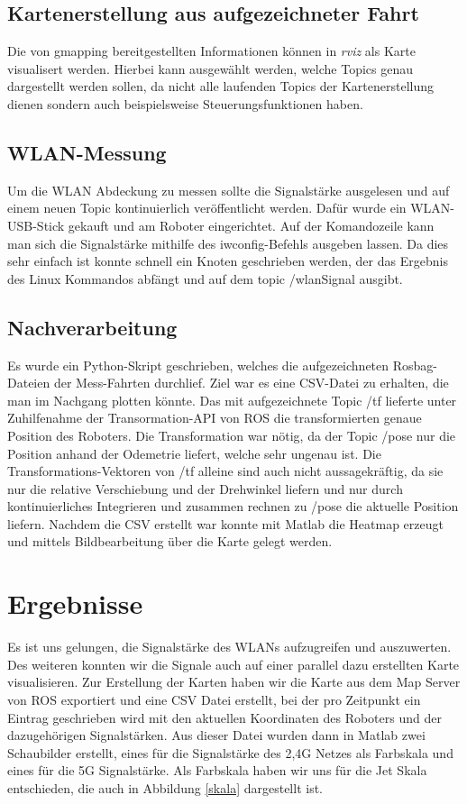 \documentclass{scrartcl}%
\begin{document}
\subsection{Kartenerstellung aus aufgezeichneter Fahrt}
Die von gmapping bereitgestellten Informationen können in \textit{rviz} als Karte visualisert werden. Hierbei kann ausgewählt werden, welche Topics genau dargestellt werden sollen, da nicht alle laufenden Topics der Kartenerstellung dienen sondern auch beispielsweise Steuerungsfunktionen haben.

\subsection{WLAN-Messung}
Um die WLAN Abdeckung zu messen sollte die Signalstärke ausgelesen und auf einem neuen Topic kontinuierlich veröffentlicht werden. Dafür wurde ein WLAN-USB-Stick gekauft und am Roboter eingerichtet. Auf der Komandozeile kann man sich die Signalstärke mithilfe des iwconfig-Befehls ausgeben lassen. Da dies sehr einfach ist konnte schnell ein Knoten geschrieben werden, der das Ergebnis des Linux Kommandos abfängt und auf dem topic /wlanSignal ausgibt.


\subsection{Nachverarbeitung}
Es wurde ein Python-Skript geschrieben, welches die aufgezeichneten Rosbag-Dateien der Mess-Fahrten durchlief. Ziel war es eine CSV-Datei zu erhalten, die man im Nachgang plotten könnte. Das mit aufgezeichnete Topic /tf lieferte unter Zuhilfenahme der Transormation-API von ROS die transformierten genaue Position des Roboters. Die Transformation war nötig, da der Topic /pose nur die Position anhand der Odemetrie liefert, welche sehr ungenau ist. Die Transformations-Vektoren von /tf alleine sind auch nicht aussagekräftig, da sie nur die relative Verschiebung und der Drehwinkel liefern und nur durch kontinuierliches Integrieren und zusammen rechnen zu /pose die aktuelle Position liefern. Nachdem die CSV erstellt war konnte mit Matlab die Heatmap erzeugt und mittels Bildbearbeitung über die Karte gelegt werden.

\newpage
\section{Ergebnisse}
Es ist uns gelungen, die Signalstärke des WLANs aufzugreifen und auszuwerten. Des weiteren konnten wir die Signale auch auf einer parallel dazu erstellten Karte visualisieren. Zur Erstellung der Karten haben wir die Karte aus dem Map Server von ROS exportiert und eine CSV Datei erstellt, bei der pro Zeitpunkt ein Eintrag geschrieben wird mit den aktuellen Koordinaten des Roboters und der dazugehörigen Signalstärken. Aus dieser Datei wurden dann in Matlab zwei Schaubilder erstellt, eines für die Signalstärke des 2,4G Netzes als Farbskala und eines für die 5G Signalstärke. Als Farbskala haben wir uns für die Jet Skala entschieden, die auch in Abbildung \ref{skala} dargestellt ist.
\end{document}
